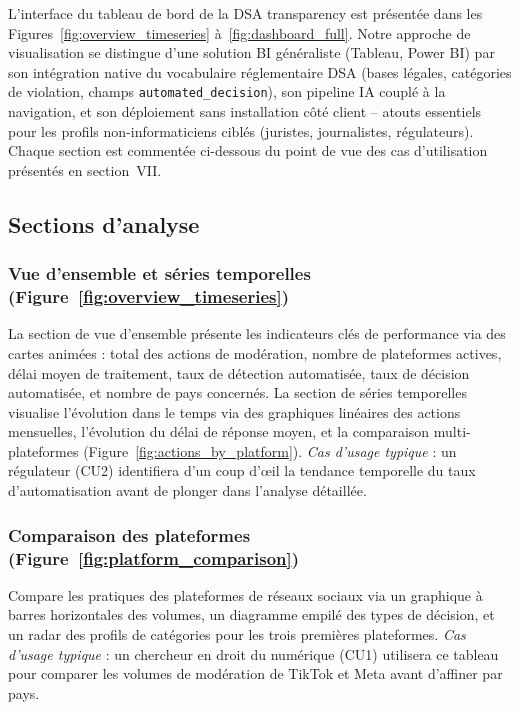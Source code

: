 \documentclass[10pt,twocolumn,a4paper]{article}
\begin{document}
L'interface du tableau de bord de la DSA transparency est présentée dans les Figures~\ref{fig:overview_timeseries} à~\ref{fig:dashboard_full}. Notre approche de visualisation se distingue d'une solution BI généraliste (Tableau, Power BI) par son intégration native du vocabulaire réglementaire DSA (bases légales, catégories de violation, champs \texttt{automated\_decision}), son pipeline IA couplé à la navigation, et son déploiement sans installation côté client -- atouts essentiels pour les profils non-informaticiens ciblés (juristes, journalistes, régulateurs). Chaque section est commentée ci-dessous du point de vue des cas d'utilisation présentés en section~VII.

\subsection{Sections d'analyse}

\subsubsection{Vue d'ensemble et séries temporelles (Figure~\ref{fig:overview_timeseries})}
La section de vue d'ensemble présente les indicateurs clés de performance via des cartes animées : total des actions de modération, nombre de plateformes actives, délai moyen de traitement, taux de détection automatisée, taux de décision automatisée, et nombre de pays concernés. La section de séries temporelles visualise l'évolution dans le temps via des graphiques linéaires des actions mensuelles, l'évolution du délai de réponse moyen, et la comparaison multi-plateformes (Figure~\ref{fig:actions_by_platform}). \textit{Cas d'usage typique} : un régulateur (CU2) identifiera d'un coup d'œil la tendance temporelle du taux d'automatisation avant de plonger dans l'analyse détaillée.

\subsubsection{Comparaison des plateformes (Figure~\ref{fig:platform_comparison})}
Compare les pratiques des plateformes de réseaux sociaux via un graphique à barres horizontales des volumes, un diagramme empilé des types de décision, et un radar des profils de catégories pour les trois premières plateformes. \textit{Cas d'usage typique} : un chercheur en droit du numérique (CU1) utilisera ce tableau pour comparer les volumes de modération de TikTok et Meta avant d'affiner par pays.
\end{document}
